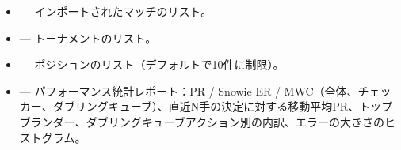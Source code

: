 \documentclass[letterpaper,10pt,dvipdfmx]{sphinxmanual}
\begin{document}
\sphinxAtStartPar
{}
\begin{itemize}
\item {} 
\sphinxAtStartPar
{} — インポートされたマッチのリスト。

\item {} 
\sphinxAtStartPar
{} — トーナメントのリスト。

\item {} 
\sphinxAtStartPar
{} — ポジションのリスト（デフォルトで10件に制限）。

\item {} 
\sphinxAtStartPar
{} — パフォーマンス統計レポート：PR / Snowie ER / MWC（全体、チェッカー、ダブリングキューブ）、直近N手の決定に対する移動平均PR、トップブランダー、ダブリングキューブアクション別の内訳、エラーの大きさのヒストグラム。

\end{itemize}
\end{document}
